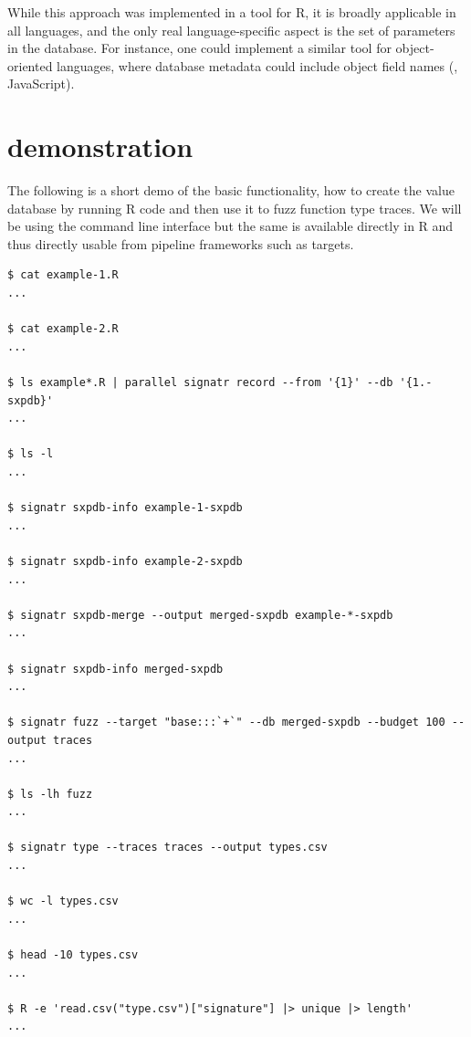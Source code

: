 \documentclass[sigplan,nonacm,anonymous,review]{acmart}
\begin{document}
While this approach was implemented in a tool for R, it is broadly applicable in all languages, and the only real language-specific aspect is the set of parameters in the database.
For instance, one could implement a similar tool for object-oriented languages, where database metadata could include object field names (\Eg, JavaScript).




\appendix

\section{\tool demonstration}\label{sec:demo}

The following is a short demo of the basic \tool functionality, \Ie how to create the value database by running R code and then use it to fuzz function type traces.
We will be using the command line interface but the same is available directly in R and thus directly usable from pipeline frameworks such as targets.


\begin{lstlisting}
$ cat example-1.R
...

$ cat example-2.R
...

$ ls example*.R | parallel signatr record --from '{1}' --db '{1.-sxpdb}'
...

$ ls -l
...

$ signatr sxpdb-info example-1-sxpdb
...

$ signatr sxpdb-info example-2-sxpdb
...

$ signatr sxpdb-merge --output merged-sxpdb example-*-sxpdb
...

$ signatr sxpdb-info merged-sxpdb
...

$ signatr fuzz --target "base:::`+`" --db merged-sxpdb --budget 100 --output traces
...

$ ls -lh fuzz
...

$ signatr type --traces traces --output types.csv
...

$ wc -l types.csv
...

$ head -10 types.csv
...

$ R -e 'read.csv("type.csv")["signature"] |> unique |> length'
...

\end{lstlisting}
\end{document}
